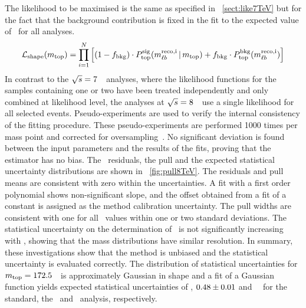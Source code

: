 %
The likelihood to be maximised is the same as specified in \sect~\ref{sect:like7TeV} but for the fact that the background contribution is fixed in the fit to the expected value of \bkgfrBDT\ for all analyses.
\begin{equation*}
%
\Like(\mt) = 
\prod_{i=1}^{N} 
\left[ (1-\fbkg)\cdot \Ptopsig(\mlbri \,\vert\, \mt) + \fbkg \cdot \Ptopbkg(\mlbri) \right]
%
\end{equation*}
%
In contrast to the ${\sqrt{s}}=7$~\TeV\ analyses, where the likelihood functions for the samples containing one or two  have been treated independently and only combined at likelihood level, the analyses at ${\sqrt{s}}=8$~\TeV\ use a single likelihood for all selected events. %
%
Pseudo-experiments are used to verify the internal consistency of the fitting procedure.
%
These pseudo-experiments are performed 1000 times per mass point and corrected for oversampling~\cite{BarlowCF}. No significant deviation is found between the input parameters and the results of the fits, proving that the estimator has no bias. The \mt\ residuals, the pull and the expected statistical uncertainty distributions are shown in \fig~\ref{fig:pull8TeV}.
%
The residuals and pull means are consistent with zero within the uncertainties. A fit with a first order polynomial shows non-significant slope, and the offset obtained from a fit of a constant is assigned as the method calibration uncertainty. 
%
The pull widths are consistent with one for all \mt\ values within one or two standard deviations. The statistical uncertainty on the determination of \mt\ is not significantly increasing with \mt, showing that the mass distributions have similar resolution.
%
In summary, these investigations show that the method is unbiased and the statistical uncertainty is evaluated correctly.
%
The distribution of statistical uncertainties for $m_{\mathrm{top}}=172.5$~\GeV\ is approximately Gaussian in shape and a fit of a Gaussian function yields expected statistical uncertainties of \ExpstatuncStandard, $0.48\pm0.01$ and \ExpstatuncBDT~\GeV\ for the standard, the \cutbased\ and \mvabased\ analysis, respectively.





















